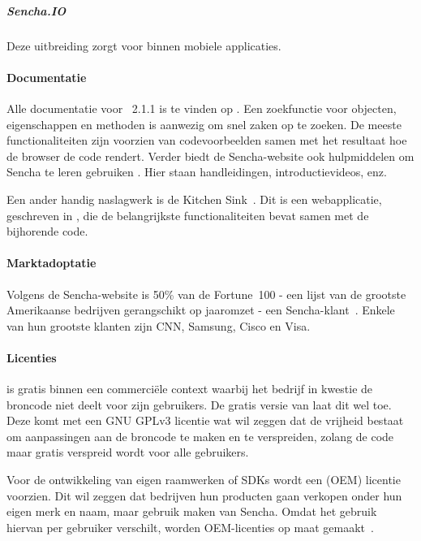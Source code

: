 \subparagraph{Sencha.IO}
Deze uitbreiding zorgt voor  binnen mobiele applicaties.  

\paragraph{Documentatie}
Alle documentatie voor \st{}~2.1.1 is te vinden op .  
Een zoekfunctie voor objecten,  eigenschappen en methoden is aanwezig om snel zaken op te zoeken.  
De meeste functionaliteiten zijn voorzien van codevoorbeelden samen met het resultaat hoe de browser de code rendert.  
Verder biedt de Sencha-website ook hulpmiddelen om Sencha te leren gebruiken .  
Hier staan handleidingen, introductievideos, enz.

Een ander handig naslagwerk is de Kitchen Sink~\cite{Inc.2013}.  
Dit is een webapplicatie,  geschreven in \st{},  die de belangrijkste functionaliteiten bevat samen met de bijhorende code.  

\paragraph{Marktadoptatie}
Volgens de Sencha-website is 50\% van de Fortune~100 - een lijst van de grootste Amerikaanse bedrijven gerangschikt op jaaromzet - een Sencha-klant~\cite{Inc.}.  
Enkele van hun grootste klanten zijn CNN,  Samsung,  Cisco en  Visa.

\paragraph{Licenties}
\st{} is gratis binnen een commerciële context waarbij het bedrijf in kwestie de broncode niet deelt voor zijn gebruikers.  
De gratis  versie van \st{} laat dit wel toe.  
Deze komt met een GNU GPLv3  licentie wat wil zeggen dat de vrijheid bestaat om aanpassingen aan de broncode te maken en te verspreiden,  zolang de code maar gratis verspreid wordt voor alle gebruikers.
  
Voor de ontwikkeling van eigen raamwerken of SDKs wordt een  (OEM) licentie voorzien.  
Dit wil zeggen dat bedrijven hun producten gaan verkopen onder hun eigen merk en naam, maar gebruik maken van Sencha.  
Omdat het gebruik hiervan per gebruiker verschilt,  worden OEM-licenties op maat gemaakt~\cite{Inc.}.

